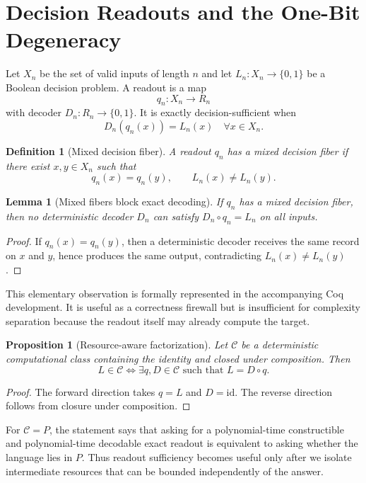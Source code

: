 \documentclass[11pt]{article}
\newtheorem{lemma}[theorem]{Lemma}
\newtheorem{proposition}[theorem]{Proposition}
\newtheorem{definition}[theorem]{Definition}
\begin{document}
\section{Decision Readouts and the One-Bit Degeneracy}

Let $X_n$ be the set of valid inputs of length $n$ and let $L_n:X_n\to\{0,1\}$ be a Boolean decision problem. A readout is a map
\[
q_n:X_n\to R_n
\]
with decoder $D_n:R_n\to\{0,1\}$. It is exactly decision-sufficient when
\[
D_n(q_n(x))=L_n(x) \quad \forall x\in X_n.
\]

\begin{definition}[Mixed decision fiber]
A readout $q_n$ has a mixed decision fiber if there exist $x,y\in X_n$ such that
\[
q_n(x)=q_n(y), \qquad L_n(x)\neq L_n(y).
\]
\end{definition}

\begin{lemma}[Mixed fibers block exact decoding]
If $q_n$ has a mixed decision fiber, then no deterministic decoder $D_n$ can satisfy $D_n\circ q_n=L_n$ on all inputs.
\end{lemma}
\begin{proof}
If $q_n(x)=q_n(y)$, then a deterministic decoder receives the same record on $x$ and $y$, hence produces the same output, contradicting $L_n(x)\neq L_n(y)$.
\end{proof}

This elementary observation is formally represented in the accompanying Coq development. It is useful as a correctness firewall but is insufficient for complexity separation because the readout itself may already compute the target.

\begin{proposition}[Resource-aware factorization]
Let $\mathcal C$ be a deterministic computational class containing the identity and closed under composition. Then
\[
L\in\mathcal C
\iff
\exists q,D\in\mathcal C\text{ such that }L=D\circ q.
\]
\end{proposition}
\begin{proof}
The forward direction takes $q=L$ and $D=\mathrm{id}$. The reverse direction follows from closure under composition.
\end{proof}

For $\mathcal C=P$, the statement says that asking for a polynomial-time constructible and polynomial-time decodable exact readout is equivalent to asking whether the language lies in $P$. Thus readout sufficiency becomes useful only after we isolate intermediate resources that can be bounded independently of the answer.
\end{document}
